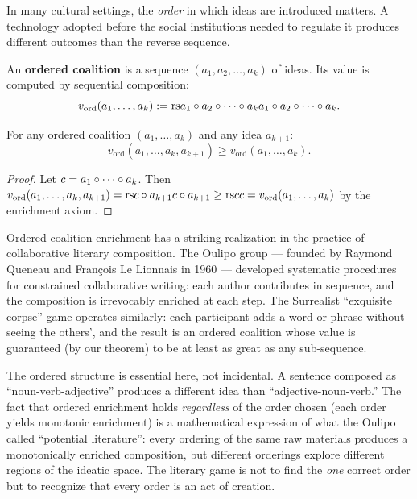In many cultural settings, the \emph{order} in which ideas are introduced
matters.  A technology adopted before the social institutions needed to regulate
it produces different outcomes than the reverse sequence.

\begin{definition}
\label{def:ordered-coalition}
An \textbf{ordered coalition} is a sequence $(a_1, a_2, \ldots, a_k)$ of
ideas.  Its value is computed by sequential composition:
\[
  v_{\mathrm{ord}}(a_1, \ldots, a_k) := \mathrm{rs}{a_1 \circ a_2 \circ \cdots
  \circ a_k}{a_1 \circ a_2 \circ \cdots \circ a_k}.
\]
\end{definition}

\begin{theorem}
\label{thm:ordered-enrichment}
For any ordered coalition $(a_1, \ldots, a_k)$ and any idea $a_{k+1}$:
\[
  v_{\mathrm{ord}}(a_1, \ldots, a_k, a_{k+1}) \geq
  v_{\mathrm{ord}}(a_1, \ldots, a_k).
\]
\end{theorem}

\begin{proof}
Let $c = a_1 \circ \cdots \circ a_k$.  Then
$v_{\mathrm{ord}}(a_1, \ldots, a_k, a_{k+1}) = \mathrm{rs}{c \circ a_{k+1}}{c
\circ a_{k+1}} \geq \mathrm{rs}{c}{c} = v_{\mathrm{ord}}(a_1, \ldots, a_k)$
by the enrichment axiom.
\end{proof}

\begin{interpretation}
\label{interp:ch15:oulipo_collaboration}
Ordered coalition enrichment has a striking realization in the practice of
collaborative literary composition.  The Oulipo group --- founded by Raymond
Queneau and Fran\c{c}ois Le Lionnais in 1960 --- developed systematic
procedures for constrained collaborative writing: each author contributes
in sequence, and the composition is irrevocably enriched at each step.  The
Surrealist ``exquisite corpse'' game operates similarly: each participant
adds a word or phrase without seeing the others', and the result is an
ordered coalition whose value is guaranteed (by our theorem) to be at least
as great as any sub-sequence.

The ordered structure is essential here, not incidental.  A sentence
composed as ``noun-verb-adjective'' produces a different idea than
``adjective-noun-verb.''  The fact that ordered enrichment holds
\emph{regardless} of the order chosen (each order yields monotonic
enrichment) is a mathematical expression of what the Oulipo called
``potential literature'': every ordering of the same raw materials
produces a monotonically enriched composition, but different orderings
explore different regions of the ideatic space.  The literary game is
not to find the \emph{one} correct order but to recognize that every
order is an act of creation.
\end{interpretation}

